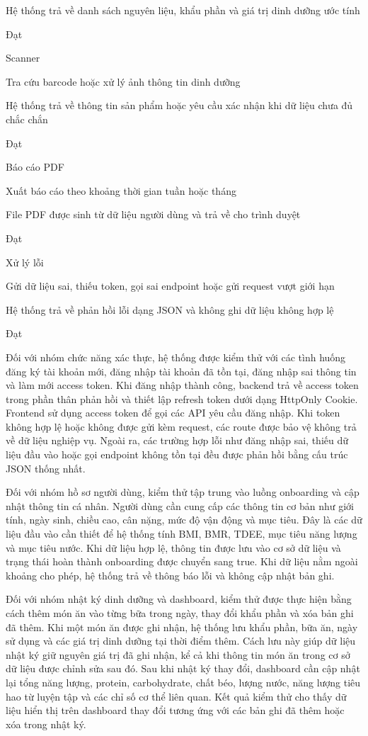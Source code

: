 \documentclass[12pt, a4paper]{report}
\begin{document}
Hệ thống trả về danh sách nguyên liệu, khẩu phần và giá trị dinh dưỡng ước tính

Đạt

Scanner

Tra cứu barcode hoặc xử lý ảnh thông tin dinh dưỡng

Hệ thống trả về thông tin sản phẩm hoặc yêu cầu xác nhận khi dữ liệu chưa đủ chắc chắn

Đạt

Báo cáo PDF

Xuất báo cáo theo khoảng thời gian tuần hoặc tháng

File PDF được sinh từ dữ liệu người dùng và trả về cho trình duyệt

Đạt

Xử lý lỗi

Gửi dữ liệu sai, thiếu token, gọi sai endpoint hoặc gửi request vượt giới hạn

Hệ thống trả về phản hồi lỗi dạng JSON và không ghi dữ liệu không hợp lệ

Đạt

Đối với nhóm chức năng xác thực, hệ thống được kiểm thử với các tình huống đăng ký tài khoản mới, đăng nhập tài khoản đã tồn tại, đăng nhập sai thông tin và làm mới access token. Khi đăng nhập thành công, backend trả về access token trong phần thân phản hồi và thiết lập refresh token dưới dạng HttpOnly Cookie. Frontend sử dụng access token để gọi các API yêu cầu đăng nhập. Khi token không hợp lệ hoặc không được gửi kèm request, các route được bảo vệ không trả về dữ liệu nghiệp vụ. Ngoài ra, các trường hợp lỗi như đăng nhập sai, thiếu dữ liệu đầu vào hoặc gọi endpoint không tồn tại đều được phản hồi bằng cấu trúc JSON thống nhất.

Đối với nhóm hồ sơ người dùng, kiểm thử tập trung vào luồng onboarding và cập nhật thông tin cá nhân. Người dùng cần cung cấp các thông tin cơ bản như giới tính, ngày sinh, chiều cao, cân nặng, mức độ vận động và mục tiêu. Đây là các dữ liệu đầu vào cần thiết để hệ thống tính BMI, BMR, TDEE, mục tiêu năng lượng và mục tiêu nước. Khi dữ liệu hợp lệ, thông tin được lưu vào cơ sở dữ liệu và trạng thái hoàn thành onboarding được chuyển sang true. Khi dữ liệu nằm ngoài khoảng cho phép, hệ thống trả về thông báo lỗi và không cập nhật bản ghi.

Đối với nhóm nhật ký dinh dưỡng và dashboard, kiểm thử được thực hiện bằng cách thêm món ăn vào từng bữa trong ngày, thay đổi khẩu phần và xóa bản ghi đã thêm. Khi một món ăn được ghi nhận, hệ thống lưu khẩu phần, bữa ăn, ngày sử dụng và các giá trị dinh dưỡng tại thời điểm thêm. Cách lưu này giúp dữ liệu nhật ký giữ nguyên giá trị đã ghi nhận, kể cả khi thông tin món ăn trong cơ sở dữ liệu được chỉnh sửa sau đó. Sau khi nhật ký thay đổi, dashboard cần cập nhật lại tổng năng lượng, protein, carbohydrate, chất béo, lượng nước, năng lượng tiêu hao từ luyện tập và các chỉ số cơ thể liên quan. Kết quả kiểm thử cho thấy dữ liệu hiển thị trên dashboard thay đổi tương ứng với các bản ghi đã thêm hoặc xóa trong nhật ký.
\end{document}
